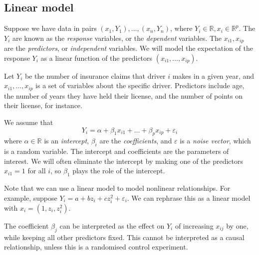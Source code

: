 \subsection{Linear model}
Suppose we have data in pairs \( (x_1, Y_1), \dots, (x_n, Y_n) \), where \( Y_i \in \mathbb R, x_i \in \mathbb R^p \).
The \( Y_i \) are known as the \textit{response} variables, or the \textit{dependent} variables.
The \( x_{i1}, x_{ip} \) are the \textit{predictors}, or \textit{independent} variables.
We will model the expectation of the response \( Y_i \) as a linear function of the predictors \( (x_{i1}, \dots, x_{ip}) \).
\begin{example}
	Let \( Y_i \) be the number of insurance claims that driver \( i \) makes in a given year, and \( x_{i1}, \dots, x_{ip} \) is a set of variables about the specific driver.
	Predictors include age, the number of years they have held their license, and the number of points on their license, for instance.
\end{example}
We assume that
\[ Y_i = \alpha + \beta_1 x_{i1} + \dots + \beta_p x_{ip} + \varepsilon_i \]
where \( \alpha \in \mathbb R \) is an \textit{intercept}, \( \beta_i \) are the \textit{coefficients}, and \( \varepsilon \) is a \textit{noise vector}, which is a random variable.
The intercept and coefficients are the parameters of interest.
We will often eliminate the intercept by making one of the predictors \( x_{i1} = 1 \) for all \( i \), so \( \beta_1 \) plays the role of the intercept.

Note that we can use a linear model to model nonlinear relationships.
For example, suppose \( Y_i = a + bz_i + cz_i^2 + \varepsilon_i \).
We can rephrase this as a linear model with \( x_i = (1, z_i, z_i^2) \).

The coefficient \( \beta_j \) can be interpreted as the effect on \( Y_i \) of increasing \( x_{ij} \) by one, while keeping all other predictors fixed.
This cannot be interpreted as a causal relationship, unless this is a randomised control experiment.

